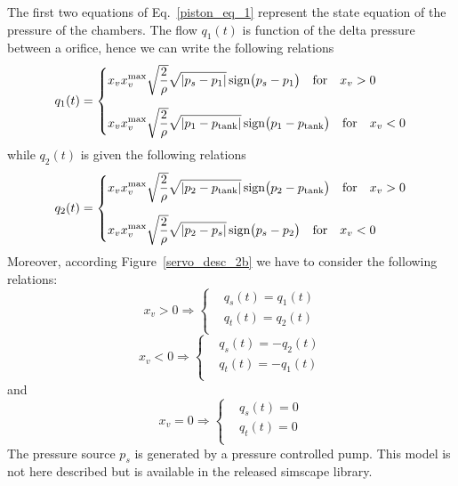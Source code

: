 \documentclass[12pt,a4paper,oneside]{book}
\begin{document}
\begin{onehalfspace}
The first two equations of Eq.~\eqref{piston_eq_1} represent the state equation of the pressure of the chambers. The flow $q_1(t)$ is function of the delta pressure between a orifice, hence we can write the following relations
\begin{equation}\label{piston_eq_2a}
	q_1(t) = \left\lbrace \begin{aligned}
		&x_vx_v^{\text{max}}\sqrt{\frac{2}{\rho}}\sqrt{|p_{s}-p_1|}\,\text{sign}\big(p_{s}-p_1\big) \quad \text{for} \quad x_v > 0 \\[6pt]
		&x_vx_v^{\text{max}}\sqrt{\frac{2}{\rho}}\sqrt{|p_{1}-p_\text{tank}|}\,\text{sign}\big(p_{1}-p_\text{tank}\big) \quad \text{for} \quad x_v < 0
	\end{aligned}\right. 
\end{equation}
while $q_2(t)$ is given the following relations
\begin{equation}\label{piston_eq_2b}
	q_2(t) = \left\lbrace \begin{aligned}
		&x_vx_v^{\text{max}}\sqrt{\frac{2}{\rho}}\sqrt{|p_{2}-p_\text{tank}|}\,\text{sign}\big(p_{2}-p_\text{tank}\big) \quad \text{for} \quad x_v > 0 \\[6pt]
		&x_vx_v^{\text{max}}\sqrt{\frac{2}{\rho}}\sqrt{|p_{2}-p_s|}\,\text{sign}\big(p_{s}-p_2\big) \quad \text{for} \quad x_v < 0
	\end{aligned}\right. 
\end{equation}
Moreover, according Figure~\ref{servo_desc_2b} we have to consider the following relations:
\begin{equation}
	x_v>0\Rightarrow\left\lbrace \begin{aligned}
		&q_s(t) = q_1(t) \\[6pt]
		&q_t(t) = q_2(t) \\[6pt]
	\end{aligned}\right. 
\end{equation}
\begin{equation}
	x_v<0\Rightarrow\left\lbrace \begin{aligned}
		&q_s(t) = -q_2(t) \\[6pt]
		&q_t(t) = -q_1(t) \\[6pt]
	\end{aligned}\right. 
\end{equation}
and
\begin{equation}
	x_v=0\Rightarrow\left\lbrace \begin{aligned}
		&q_s(t) = 0 \\[6pt]
		&q_t(t) = 0 \\[6pt]
	\end{aligned}\right. 
\end{equation}
The pressure source $p_s$ is generated by a pressure controlled pump. This model is not here described but is available in the released simscape library.   


\end{onehalfspace}
\end{document}
